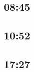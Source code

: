 \hypertarget{section}{%
\subsection{08:45}\label{section}}

\lipsum[1]

\hypertarget{section-1}{%
\subsection{10:52}\label{section-1}}

\lipsum[2]

\hypertarget{section-2}{%
\subsection{17:27}\label{section-2}}

\lipsum[3]
